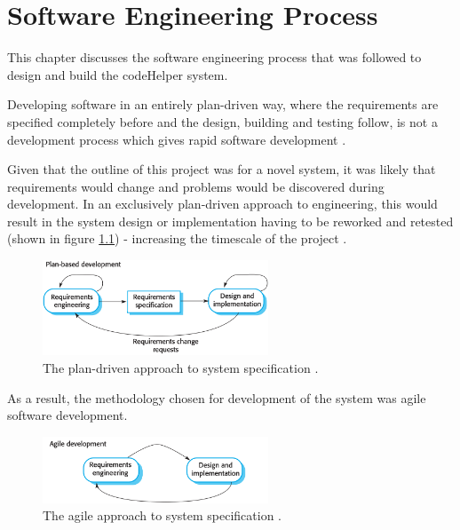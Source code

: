 \chapter{Software Engineering Process}\label{sec:agile}

This chapter discusses the software engineering process that was followed to design and build the codeHelper system.

Developing software in an entirely plan-driven way, where the requirements are specified completely before and the design, building and testing follow, is not a development process which gives rapid software development \cite{sommerville}. 

Given that the outline of this project was for a novel system, it was likely that requirements would change and problems would be discovered during development. In an exclusively plan-driven approach to engineering, this would result in the system design or implementation having to be reworked and retested (shown in figure \ref{fig:planspec}) - increasing the timescale of the project \cite{sommerville}.

\begin{figure}[H]
    \centering
    \includegraphics[width=0.6\textwidth]{6swengprocess/images/planspec.png}
    \caption{The plan-driven approach to system specification \cite{sommerville}.}
    \label{fig:planspec}
\end{figure}

As a result, the methodology chosen for development of the system was agile software development. 


\begin{figure}[H]
    \centering
    \includegraphics[width=0.6\textwidth]{6swengprocess/images/agilespec.png}
    \caption{The agile approach to system specification \cite{sommerville}.}
    \label{fig:agilespec}
\end{figure}

